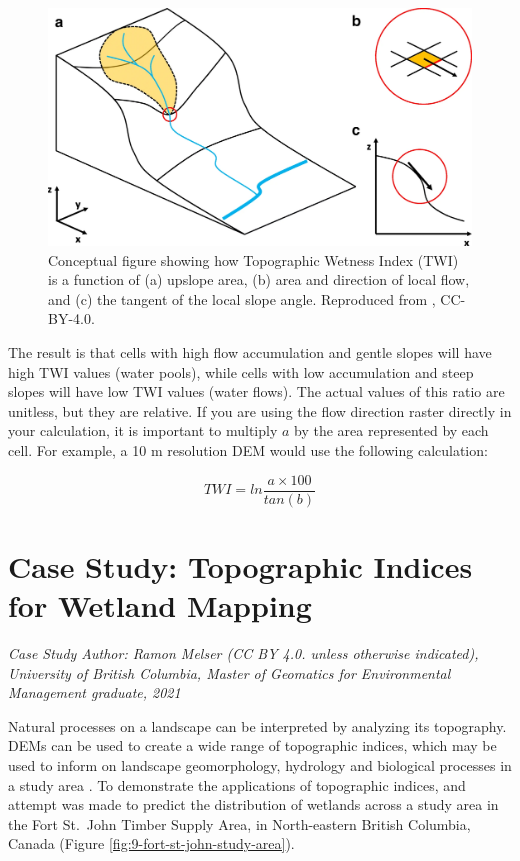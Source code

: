 \documentclass[
]{book}
\begin{document}
\begin{figure}
\includegraphics[width=0.75\linewidth]{images/09-Mattivi-et-al-2019-figure-1} \caption{Conceptual figure showing how Topographic Wetness Index (TWI) is a function of (a) upslope area, (b) area and direction of local flow, and (c) the tangent of the local slope angle. Reproduced from \citep{mattivi_twi_2019}, CC-BY-4.0.}\label{fig:9-Mattivi-et-al-2019-figure-1}
\end{figure}

The result is that cells with high flow accumulation and gentle slopes will have high TWI values (water pools), while cells with low accumulation and steep slopes will have low TWI values (water flows). The actual values of this ratio are unitless, but they are relative. If you are using the flow direction raster directly in your calculation, it is important to multiply \(a\) by the area represented by each cell. For example, a 10 m resolution DEM would use the following calculation:

\[
TWI=ln\frac{a×100}{tan(b)}
\]

\section{Case Study: Topographic Indices for Wetland Mapping}\label{case-study-topographic-indices-for-wetland-mapping}

\emph{Case Study Author: Ramon Melser (CC BY 4.0. unless otherwise indicated), University of British Columbia, Master of Geomatics for Environmental Management graduate, 2021}

Natural processes on a landscape can be interpreted by analyzing its topography. DEMs can be used to create a wide range of topographic indices, which may be used to inform on landscape geomorphology, hydrology and biological processes in a study area \citep{mattivi_twi_2019}. To demonstrate the applications of topographic indices, and attempt was made to predict the distribution of wetlands across a study area in the Fort St.~John Timber Supply Area, in North-eastern British Columbia, Canada (Figure \ref{fig:9-fort-st-john-study-area}).
\end{document}
